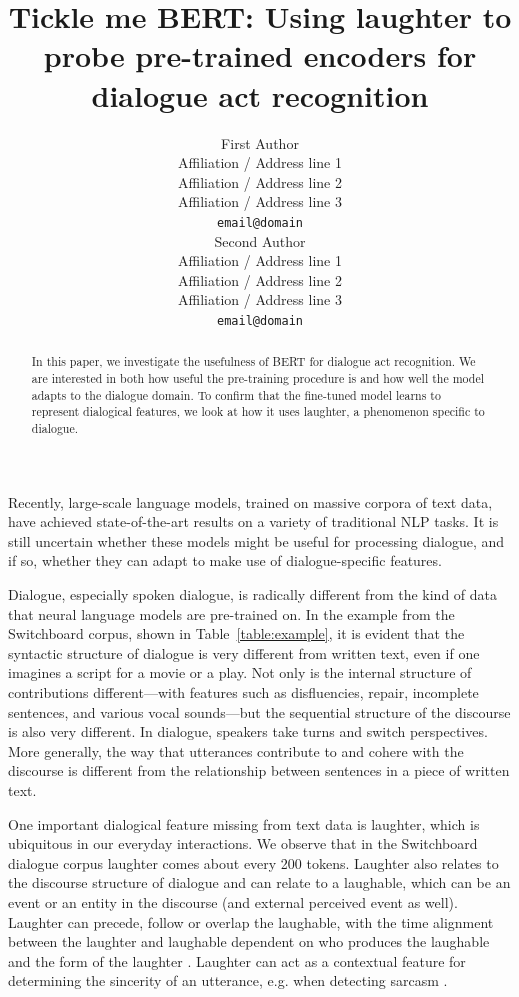 \documentclass[11pt,a4paper]{article}
\title{Tickle me BERT: Using laughter to probe pre-trained encoders for dialogue act recognition}
\author{First Author \\
  Affiliation / Address line 1 \\
  Affiliation / Address line 2 \\
  Affiliation / Address line 3 \\
  \texttt{email@domain} \\\And
  Second Author \\
  Affiliation / Address line 1 \\
  Affiliation / Address line 2 \\
  Affiliation / Address line 3 \\
  \texttt{email@domain} \\}
\date{}
\begin{document}
\maketitle
\begin{abstract}
  In this paper, we investigate the usefulness of BERT for dialogue act recognition.
  We are interested in both how useful the pre-training procedure is and 
  how well the model adapts to the dialogue domain.
  To confirm that the fine-tuned model learns to represent dialogical features, 
  we look at how it uses laughter, a phenomenon specific to dialogue.


\end{abstract}


Recently, large-scale language models, trained on massive corpora of text data, have achieved state-of-the-art results on a variety of traditional NLP tasks.
It is still uncertain whether these models might be useful for processing dialogue, and if so, whether they can adapt to make use of dialogue-specific features.

Dialogue, especially spoken dialogue, is radically different from the kind of data that neural language models are pre-trained on.
In the example from the Switchboard corpus, shown in Table~\ref{table:example}, it is evident that the syntactic structure of dialogue is very different from  written text, even if one imagines a script for a movie or a play.
Not only is the internal structure of contributions different---with features such as disfluencies, repair, incomplete sentences, and various vocal sounds---but the sequential structure of the discourse is also very different.
In dialogue, speakers take turns and switch perspectives.
More generally, the way that utterances contribute to and cohere with the discourse is different from the relationship between sentences in a piece of written text.

One important dialogical feature missing from text data is laughter, which is ubiquitous in our everyday interactions.
We observe that in the Switchboard dialogue corpus laughter comes about every 200 tokens.
Laughter also relates to the discourse structure of dialogue and can relate to a laughable, which can be an event or an entity in the discourse (and external perceived event as well).
Laughter can precede, follow or overlap the laughable, with the time alignment between the laughter and laughable dependent on who produces the laughable and the form of the laughter \citep{tian2016we}.
Laughter can act as a contextual feature for determining the sincerity of an utterance, e.g. when detecting sarcasm \citep{tepperman2006yeah}.
\end{document}
